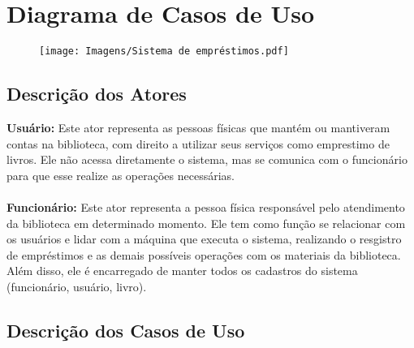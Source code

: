 \chapter{Diagrama de Casos de Uso}
\begin{figure}[h]
    \centering
    \texttt{[image: Imagens/Sistema de empréstimos.pdf]}
\end{figure}

\section{Descrição dos Atores}

\textbf{Usuário:} Este ator representa as pessoas físicas que mantém ou mantiveram contas na biblioteca, com direito a utilizar seus serviços como emprestimo de livros. Ele não acessa diretamente o sistema, mas se comunica com o funcionário para que esse realize as operações necessárias.\\\\

\textbf{Funcionário:} Este ator representa a pessoa física responsável pelo atendimento da biblioteca em determinado momento. Ele tem como função se relacionar com os usuários e lidar com a máquina que executa o sistema, realizando o resgistro de empréstimos e as demais possíveis operações com os materiais da biblioteca. Além disso, ele é encarregado  de manter todos os cadastros do sistema (funcionário, usuário, livro).
	
\section{Descrição dos Casos de Uso}

